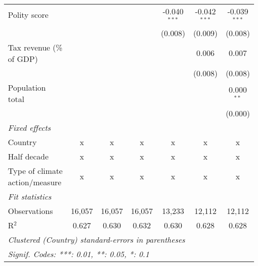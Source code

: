 \begin{tabular}{lcccccc}
   Polity score                                                  &         &               &               & -0.040$^{***}$ & -0.042$^{***}$ & -0.039$^{***}$\\   
                                                                 &         &               &               & (0.008)        & (0.009)        & (0.008)\\   
   Tax revenue (\% of GDP)                                       &         &               &               &                & 0.006          & 0.007\\   
                                                                 &         &               &               &                & (0.008)        & (0.008)\\   
   Population total                                              &         &               &               &                &                & 0.000$^{**}$\\   
                                                                 &         &               &               &                &                & (0.000)\\   
   \emph{Fixed effects}\\
   Country                                                       & x       & x             & x             & x              & x              & x\\  
   Half decade                                                   & x       & x             & x             & x              & x              & x\\  
   Type of climate action/measure                                & x       & x             & x             & x              & x              & x\\  
   \midrule \emph{Fit statistics}\\
   Observations                                                  & 16,057  & 16,057        & 16,057        & 13,233         & 12,112         & 12,112\\  
   R$^2$                                                         & 0.627   & 0.630         & 0.632         & 0.630          & 0.628          & 0.628\\  
   \midrule
   \multicolumn{7}{l}{\emph{Clustered (Country) standard-errors in parentheses}}\\
   \multicolumn{7}{l}{\emph{Signif. Codes: ***: 0.01, **: 0.05, *: 0.1}}\\
\end{tabular}
\par\endgroup


